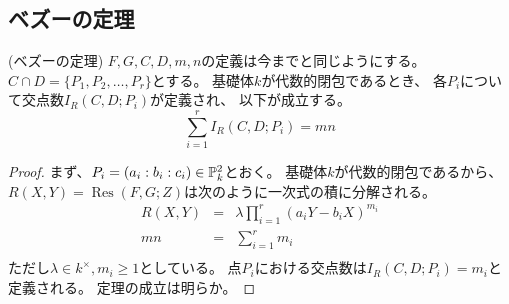 \documentclass[a4paper]{jsarticle}
\newcommand{\Res}{\operatorname{Res}}
\begin{document}
    \subsection{ベズーの定理}
    \begin{Them}(ベズーの定理)
    $F,G,C,D,m,n$の定義は今までと同じようにする。
    $C \cap D=\{P_{1},P_{2}, \dots, P_{r} \}$とする。
    基礎体$k$が代数的閉包であるとき、
    各$P_{i}$について交点数$I_{R}(C,D; P_i)$が定義され、
    以下が成立する。
    \[ \sum_{i=1}^{r}{I_{R}(C,D; P_i)}=mn \]
    \end{Them}
    \begin{proof}
        まず、$P_{i}=(a_i:b_i:c_i) \in \mathbb{P}_{k}^2$とおく。
        基礎体$k$が代数的閉包であるから、
        $R(X,Y)=\Res(F,G; Z)$は次のように一次式の積に分解される。
        \begin{eqnarray*}
            R(X,Y)&=&\lambda \prod_{i=1}^{r}(a_i Y - b_i X)^{m_i} \\
            mn&=&\sum_{i=1}^{r}{m_i} \\
        \end{eqnarray*}
        ただし$\lambda \in k^{\times}, m_i \geq 1$としている。
        点$P_i$における交点数は$I_{R}(C,D; P_i)=m_i$と定義される。
        定理の成立は明らか。
        
    \end{proof}
\end{document}
